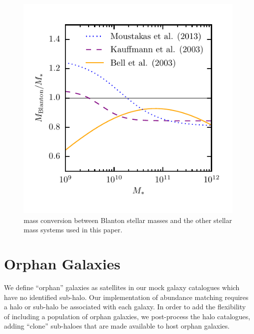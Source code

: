 \documentclass[a4paper,fleqn,usenatbib]{mnras}
\begin{document}
%
\begin{figure}
\includegraphics[]{figures/mstar_fconv.pdf}
\caption{mass conversion between Blanton stellar masses and the other stellar mass systems used in this paper.}
\label{fig:mstar_fconv}
\end{figure}
%


\section{Orphan Galaxies}
\label{sec:clones}
 
We define ``orphan'' galaxies as satellites in our mock galaxy catalogues which have no identified sub-halo.  Our implementation of abundance matching requires a halo or sub-halo be associated with each galaxy.  In order to add the flexibility of including a population of orphan galaxies, we post-process the halo catalogues, adding ``clone'' sub-haloes that are made available to host orphan galaxies.
\end{document}
